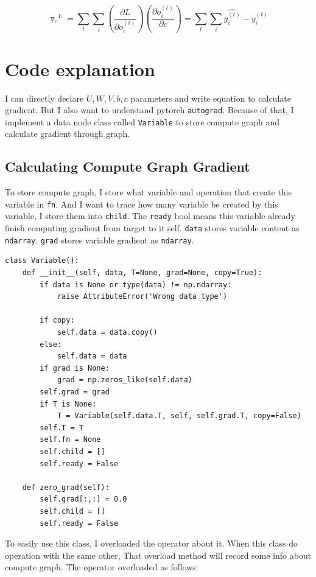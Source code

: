 \documentclass[12pt]{article}
\begin{document}
\begin{equation}
{\triangledown_c}^L = \sum_t \sum_i (\frac{\partial L}{\partial o_i^{(t)}}) (\frac{\partial o_i^{(t)}}{\partial c}) = \sum_t \sum_i \hat{y_i^{(t)}} - y_i^{(t)} 
\end{equation}

\section{Code explanation}

I can directly declare $U, W, V, b, c$ parameters and write equation to calculate gradient. But I also want to understand pytorch \verb|autograd|. Because of that, I implement a data node class called \verb|Variable| to store compute graph and calculate gradient through graph.

\subsection{Calculating Compute Graph Gradient}

To store compute graph, I store what variable and operation that create this variable in \verb|fn|. And I want to trace how many variable be created by this variable, I store them into \verb|child|. The \verb|ready| bool means this variable already finish computing gradient from target to it self. \verb|data| stores variable content as \verb|ndarray|. \verb|grad| stores variable gradient as \verb|ndarray|.

\begin{verbatim}
class Variable():
    def __init__(self, data, T=None, grad=None, copy=True):
        if data is None or type(data) != np.ndarray:
            raise AttributeError('Wrong data type')
        
        if copy:
            self.data = data.copy()
        else:
            self.data = data
        if grad is None:
            grad = np.zeros_like(self.data)
        self.grad = grad
        if T is None:
            T = Variable(self.data.T, self, self.grad.T, copy=False)
        self.T = T
        self.fn = None
        self.child = []
        self.ready = False
    
    def zero_grad(self):
        self.grad[:,:] = 0.0
        self.child = []
        self.ready = False
\end{verbatim}

To easily use this class, I overloaded the operator about it. When this class do operation with the same other, That overload method will record some info about compute graph. The operator overloaded as follows:
\end{document}
